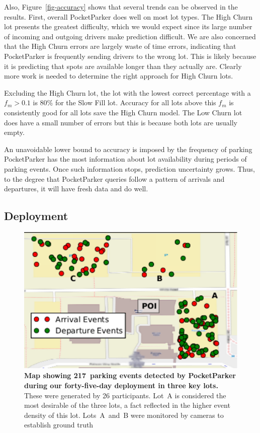 Also, Figure~\ref{fig-accuracy} shows that several trends can be observed 
in the results. First, overall PocketParker does well on most lot types. 
The High Churn lot presents the greatest difficulty, which we would expect 
since its large number of incoming and outgoing drivers make prediction 
difficult. We are also concerned that the High Churn errors are largely 
waste of time errors, indicating that PocketParker is frequently sending 
drivers to the wrong lot.  This is likely because it is predicting that 
spots are available longer than they actually are. Clearly more work is 
needed to determine the right approach for High Churn lots.

Excluding the High Churn lot, the lot with the lowest correct percentage with
a $f_m > 0.1$ is 80\% for the Slow Fill lot.  Accuracy for all lots above
this $f_m$ is consistently good for all lots save the High Churn model.  The
Low Churn lot does have a small number of errors but this is because both lots
are usually empty.

An unavoidable lower bound to accuracy is imposed by the frequency of parking
PocketParker has the most information about lot availability during periods
of parking events. Once such information stops, prediction uncertainty
grows.  Thus, to the degree that PocketParker queries follow a pattern of
arrivals and departures, it will have fresh data and do well.

\subsection{Deployment}

\begin{figure}
\centering
\includegraphics[trim=0 0 0 1mm,clip, width=\columnwidth]{./figures/smallEventsOnThreeParkingLot-anon.pdf}

\caption{\textbf{Map showing 217~parking events detected by PocketParker
during our forty-five-day deployment in three key lots.}  These were
generated by 26 participants.  Lot~A is considered the most desirable of the
three lots, a fact reflected in the higher event density of this lot.  
Lots~A~and~B were monitored by cameras to establish ground truth}

\label{fig-events}
\end{figure}

